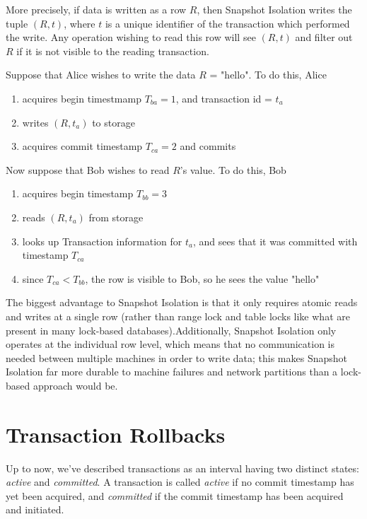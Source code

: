 More precisely, if data is written as a row $R$, then Snapshot Isolation writes the tuple $(R,t)$, where $t$ is a unique identifier of the transaction which performed the write. Any operation wishing to read this row will see $(R,t)$ and filter out $R$ if it is not visible to the reading transaction.

\begin{exmp}
	Suppose that Alice wishes to write the data $R$ = "hello". To do this, Alice
	\begin{enumerate}
		\item acquires begin timestmamp $T_{ba} = 1$, and transaction id = $t_a$
		\item writes $(R,t_a)$ to storage
		\item acquires commit timestamp $T_{ca} = 2$ and commits
	\end{enumerate}
	Now suppose that Bob wishes to read $R$'s value. To do this, Bob
	\begin{enumerate}
		\item acquires begin timestamp $T_{bb} = 3$
		\item reads $(R,t_a)$ from storage
		\item looks up Transaction information for $t_a$, and sees that it was committed with timestamp $T_{ca}$
		\item since $T_{ca} < T_{bb}$, the row is visible to Bob, so he sees the value "hello"
	\end{enumerate}	
\end{exmp}

The biggest advantage to Snapshot Isolation is that it only requires atomic reads and writes at a single row (rather than range lock and table locks like what are present in many lock-based databases).Additionally, Snapshot Isolation only operates at the individual row level, which means that no communication is needed between multiple machines in order to write data; this makes Snapshot Isolation far more durable to machine failures and network partitions than a lock-based approach would be.

\section{Transaction Rollbacks}
Up to now, we've described transactions as an interval having two distinct states: \emph{active} and \emph{committed}. A transaction is called \emph{active} if no commit timestamp has yet been acquired, and \emph{committed} if the commit timestamp has been acquired and initiated.

